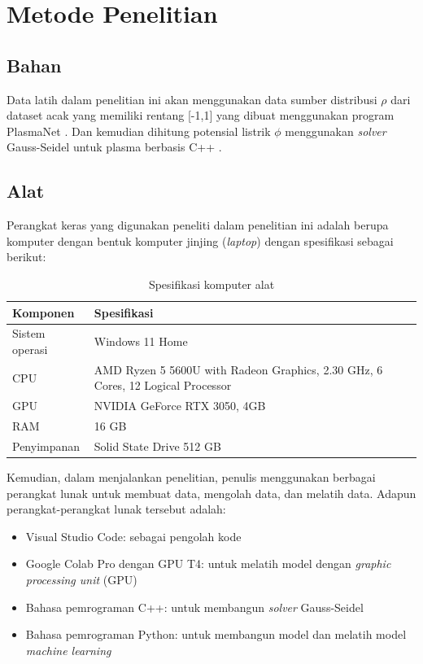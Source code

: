 \chapter{Metode Penelitian}

\section{Bahan}
Data latih dalam penelitian ini akan menggunakan data sumber distribusi $\rho$ dari dataset acak yang memiliki rentang [-1,1] yang dibuat menggunakan program PlasmaNet \citep{cheng_illarramendi_bauerheim_cuenot_2021}. Dan kemudian dihitung potensial listrik $\phi$ menggunakan \emph{solver} Gauss-Seidel untuk plasma berbasis C++ \citep{lubos_brieda_2019}.

\section{Alat}
Perangkat keras yang digunakan peneliti dalam penelitian ini adalah berupa komputer dengan bentuk komputer jinjing (\emph{laptop}) dengan spesifikasi sebagai berikut:

\begin{table}[ht]
\centering
\caption{Spesifikasi komputer alat}
\begin{tabular}{|M{3cm}|M{4cm}|}
\hline
\textbf{Komponen} & \textbf{Spesifikasi} \\
\hline
Sistem operasi & Windows 11 Home\\
\hline
CPU & AMD Ryzen 5 5600U with Radeon Graphics, 2.30 GHz, 6 Cores, 12 Logical Processor \\
\hline
GPU & NVIDIA GeForce RTX 3050, 4GB\\
\hline
RAM & 16 GB\\
\hline
Penyimpanan & Solid State Drive 512 GB\\
\hline
\end{tabular}
\end{table}

Kemudian, dalam menjalankan penelitian, penulis menggunakan berbagai perangkat lunak untuk membuat data, mengolah data, dan melatih data. Adapun perangkat-perangkat lunak tersebut adalah:
\begin{itemize}
    \item Visual Studio Code: sebagai pengolah kode
    \item Google Colab Pro dengan GPU T4: untuk melatih model dengan \emph{graphic processing unit} (GPU)
    \item Bahasa pemrograman C++: untuk membangun \emph{solver} Gauss-Seidel
    \item Bahasa pemrograman Python: untuk membangun model dan melatih model \emph{machine learning}
\end{itemize}

